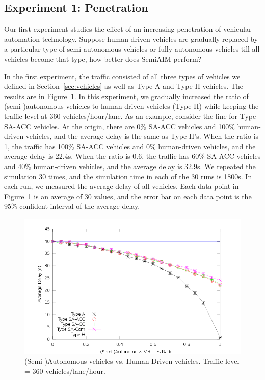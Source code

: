 \subsection{Experiment 1: Penetration}

Our first experiment studies the effect of an increasing penetration
of vehicular automation technology.  Suppose human-driven vehicles are
gradually replaced by a particular type of semi-autonomous vehicles or
fully autonomous vehicles till all vehicles become that type, how
better does SemiAIM perform?

In the first experiment, the traffic consisted of all three types of
vehicles we defined in Section~\ref{sec:vehicles} as well as Type A
and Type H vehicles.  The results are in Figure~\ref{fig:two360}.  In
this experiment, we gradually increased the ratio of (semi-)autonomous
vehicles to human-driven vehicles (Type H) while keeping the traffic
level at 360 vehicles/hour/lane. As an example, consider the line for
Type SA-ACC vehicles. At the origin, there are 0\% SA-ACC vehicles and
100\% human-driven vehicles, and the average delay is the same as Type
H's.  When the ratio is 1, the traffic has 100\% SA-ACC vehicles and
0\% human-driven vehicles, and the average delay is 22.4s.
When the ratio is 0.6, the traffic has 60\% SA-ACC vehicles and 40\%
human-driven vehicles, and the average delay is 32.9s.  We
repeated the simulation 30 times, and the simulation time in each of
the 30 runs is 1800s.  In each run, we measured the average
delay of all vehicles.  Each data point in Figure~\ref{fig:two360} is
an average of 30 values, and the error bar on each data point is the
95\% confident interval of the average delay.

\begin{figure}
\centering
\includegraphics[width=0.8\columnwidth]{figures/figure_1.png}
\caption{(Semi-)Autonomous vehicles vs. Human-Driven vehicles. Traffic
level = 360 vehicles/lane/hour.}
\label{fig:two360}
\end{figure}

